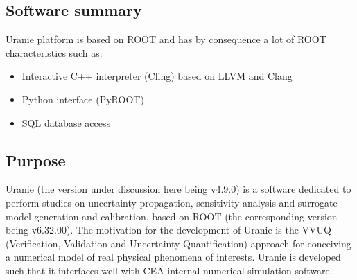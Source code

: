 \subsection{Software summary}
\label{sec:Uranie:summary}

Uranie platform is based on ROOT and has by consequence a lot of ROOT characteristics such as:
\begin{itemize}
    \item Interactive C++ interpreter (Cling) based on LLVM and Clang
    \item Python interface (PyROOT)
    \item SQL database access
\end{itemize}


\subsection{Purpose}
\label{sec:Uranie:purpose}

Uranie (the version under discussion here being v4.9.0) is a software dedicated to perform studies on uncertainty propagation, sensitivity analysis and surrogate model generation and calibration, based on ROOT (the corresponding version being v6.32.00). The motivation for the development of Uranie is the VVUQ (Verification, Validation and Uncertainty Quantification) approach for conceiving a numerical model of real physical phenomena of interests. Uranie is developed such that it interfaces well with CEA internal numerical simulation software.


